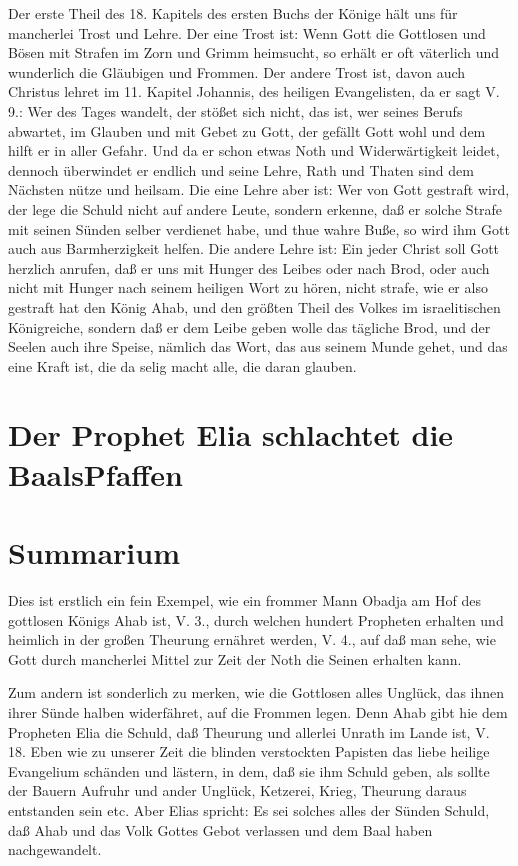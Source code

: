Der erste Theil des 18. Kapitels des ersten Buchs der Könige hält uns für mancherlei Trost und Lehre. Der eine Trost ist: Wenn Gott die Gottlosen und Bösen mit Strafen im Zorn und Grimm heimsucht, so erhält er oft väterlich und wunderlich die Gläubigen und Frommen. Der andere Trost ist, davon auch Christus lehret im 11. Kapitel Johannis, des heiligen Evangelisten, da er sagt V. 9.: Wer des Tages wandelt, der stößet sich nicht, das ist, wer seines Berufs abwartet, im Glauben und mit Gebet zu Gott, der gefällt Gott wohl und dem hilft er in aller Gefahr. Und da er schon etwas Noth und Widerwärtigkeit leidet, dennoch überwindet er endlich und seine Lehre, Rath und Thaten sind dem Nächsten nütze und heilsam. Die eine Lehre aber ist: Wer von Gott gestraft wird, der lege die Schuld nicht auf andere Leute, sondern erkenne, daß er solche Strafe mit seinen Sünden selber verdienet habe, und thue wahre Buße, so wird ihm Gott auch aus Barmherzigkeit helfen. Die andere Lehre ist: Ein jeder Christ soll Gott herzlich anrufen, daß er uns mit Hunger des Leibes oder nach Brod, oder auch nicht mit Hunger nach seinem heiligen Wort zu hören, nicht strafe, wie er also gestraft hat den König Ahab, und den größten Theil des Volkes im israelitischen Königreiche, sondern daß er dem Leibe geben wolle das tägliche Brod, und der Seelen auch ihre Speise, nämlich das Wort, das aus seinem Munde gehet, und das eine Kraft ist, die da selig macht alle, die daran glauben.

\section{Der Prophet Elia schlachtet die BaalsPfaffen}

\section{Summarium}

Dies ist erstlich ein fein Exempel, wie ein frommer Mann Obadja am Hof des gottlosen Königs Ahab ist, V. 3., durch welchen hundert Propheten erhalten und heimlich in der großen Theurung ernähret werden, V. 4., auf daß man sehe, wie Gott durch mancherlei Mittel zur Zeit der Noth die Seinen erhalten kann.

Zum andern ist sonderlich zu merken, wie die Gottlosen alles Unglück, das ihnen ihrer Sünde halben widerfähret, auf die Frommen legen. Denn Ahab gibt hie dem Propheten Elia die Schuld, daß Theurung und allerlei Unrath im Lande ist, V. 18. Eben wie zu unserer Zeit die blinden verstockten Papisten das liebe heilige Evangelium schänden und lästern, in dem, daß sie ihm Schuld geben, als sollte der Bauern Aufruhr und ander Unglück, Ketzerei, Krieg, Theurung daraus entstanden sein etc. Aber Elias spricht: Es sei solches alles der Sünden Schuld, daß Ahab und das Volk Gottes Gebot verlassen und dem Baal haben nachgewandelt.

